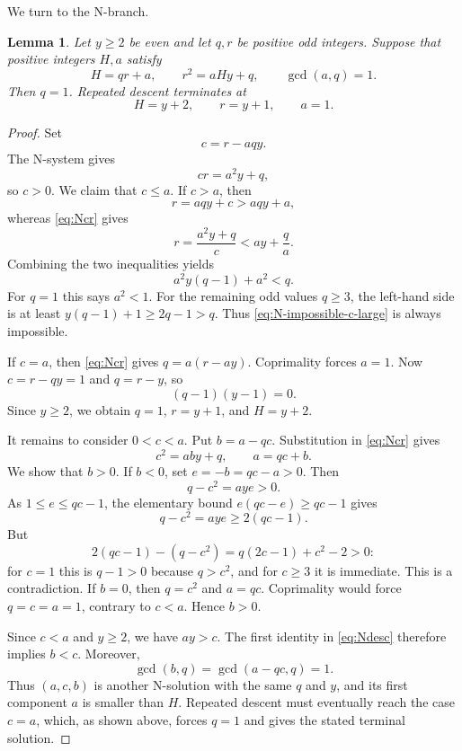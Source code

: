 \documentclass[11pt]{amsart}
\newtheorem{lemma}[theorem]{Lemma}
\theoremstyle{remark}
\begin{document}
We turn to the N-branch.

\begin{lemma}\label{lem:N}
Let $y\ge2$ be even and let $q,r$ be positive odd integers.  Suppose
that positive integers $H,a$ satisfy
\[
 H=qr+a,
 \qquad
 r^2=aHy+q,
 \qquad
 \gcd(a,q)=1.
\]
Then $q=1$.  Repeated descent terminates at
\[
 H=y+2,
 \qquad
 r=y+1,
 \qquad
 a=1.
\]
\end{lemma}

\begin{proof}
Set
\[
 c=r-aqy.
\]
The N-system gives
\begin{equation}\label{eq:Ncr}
 cr=a^2y+q,
\end{equation}
so $c>0$.  We claim that $c\le a$.  If $c>a$, then
\[
 r=aqy+c>aqy+a,
\]
whereas \eqref{eq:Ncr} gives
\[
 r=\frac{a^2y+q}{c}<ay+\frac qa.
\]
Combining the two inequalities yields
\begin{equation}\label{eq:N-impossible-c-large}
 a^2y(q-1)+a^2<q.
\end{equation}
For $q=1$ this says $a^2<1$.  For the remaining odd values $q\ge3$,
the left-hand side is at least $y(q-1)+1\ge2q-1>q$.  Thus
\eqref{eq:N-impossible-c-large} is always impossible.

If $c=a$, then \eqref{eq:Ncr} gives $q=a(r-ay)$.  Coprimality forces
$a=1$.  Now $c=r-qy=1$ and $q=r-y$, so
\[
 (q-1)(y-1)=0.
\]
Since $y\ge2$, we obtain $q=1$, $r=y+1$, and $H=y+2$.

It remains to consider $0<c<a$.  Put $b=a-qc$.  Substitution in
\eqref{eq:Ncr} gives
\begin{equation}\label{eq:Ndesc}
 c^2=aby+q,
 \qquad
 a=qc+b.
\end{equation}
We show that $b>0$.  If $b<0$, set $e=-b=qc-a>0$.  Then
\[
 q-c^2=aye>0.
\]
As $1\le e\le qc-1$, the elementary bound
$e(qc-e)\ge qc-1$ gives
\[
 q-c^2=aye\ge2(qc-1).
\]
But
\[
 2(qc-1)-(q-c^2)=q(2c-1)+c^2-2>0:
\]
for $c=1$ this is $q-1>0$ because $q>c^2$, and for $c\ge3$ it is
immediate.  This is a contradiction.  If $b=0$, then $q=c^2$ and
$a=qc$.  Coprimality would force $q=c=a=1$, contrary to $c<a$.
Hence $b>0$.

Since $c<a$ and $y\ge2$, we have $ay>c$.  The first identity in
\eqref{eq:Ndesc} therefore implies $b<c$.  Moreover,
\[
 \gcd(b,q)=\gcd(a-qc,q)=1.
\]
Thus $(a,c,b)$ is another N-solution with the same $q$ and $y$, and
its first component $a$ is smaller than $H$.  Repeated descent must
eventually reach the case $c=a$, which, as shown above, forces $q=1$
and gives the stated terminal solution.
\end{proof}
\end{document}
